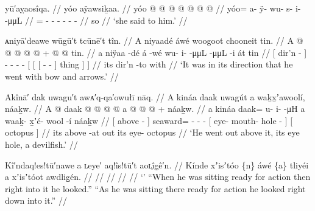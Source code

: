 
\ex\label{ex:91-203-she-said}%
%
\begingl
	\glpreamble	yū′aỵaosîqa. //
	\glpreamble	yóo aÿawsiḵaa. //
	\gla	yóo @  @ {} @ {} @ {} @ {} @ {} @ {} //
	\glb	yóo= a- ÿ- wu- s- i-  -μμL //
	\glc	{}= - - - - -
			 - //
	\gld	so  {} {} {} {} {} {} //
	\glft	‘she said to him.’
		//
\endgl
\xe


\ex\label{ex:91-204-direction-go-with-bownarrows}%
%
\begingl
	\glpreamble	ᴀniyā′deawe wūgū′t tcūnē′t tîn. //
	\glpreamble	A niyaadé áwé woogoot chooneit tin. //
	\gla	{} A  @ {} {}  @ {}
		 @ {} @ {} @ {} +
		{} {} {}  @ {} @ {} {} {} {} tin. {} //
	\glb	{} a niÿaa -dé {} á -wé
		wu- i-  -μμL
		{} {} {}  -μμL -i {} át {} tin {} //
	\glc	{}[  dir’n - {}]  -
		- -  -
		{}[ {}[ {}[  - - {}] thing {}]
			 {}] //
	\gld	{} its dir’n -to {}  {}
		 {} {} {}
		{} {} {}  {} {} {} {} {} with {} //
	\glft	‘It was in its direction that he went with bow and arrows.’
		//
\endgl
\xe

\ex\label{ex:91-205-out-above-it-eye-mouth-hole}%
%
\begingl
	\glpreamble	Akînā′ dak uwagu′t awᴀ′q-qa′owułī nāq. //
	\glpreamble	A kináa daak uwagút a waḵx̱ʼawoolí, náaḵw. //
	\gla	{} A  @ {} {}
		daak @  @ {} @ {} @ {}
		{} a  @ {} @ {} @ {} {} +
		{} náaḵw. {} //
	\glb	{} a kináa {} {}
		daak= u- i-  -μH
		{} a waaḵ- x̱ʼé- wool -í {}
		{} náaḵw {} //
	\glc	{}[  above - {}]
		seaward= - -  -
		{}[  eye- mouth- hole - {}]
		{}[ octopus {}] //
	\gld	{} its above -at {}
		out  {} {} {}
		{} its eye-  {} {} {}
		{} octopus {} //
	\glft	‘He went out above it, its eye hole, a devilfish.’
		//
\endgl
\xe

\ex\label{ex:91-206-}%
%
\begingl
	\glpreamble	Kî′ndaq!es!tū′nawe a ʟeye′ aq!îs!tū′t aoʟ̣îg̣ê′n. //
	\glpreamble	Kínde xʼisʼtóo \{n\} áwé \{a\} tliyéi a xʼisʼtóot awdlig̱én. //
	\gla	 //
	\glb	 //
	\glc	 //
	\gld	 //
	\glft	‘’\newline
		“When he was sitting ready for action then right into it he looked.”\newline
		“As he was sitting there ready for action he looked right down into it.”
		//
\endgl
\xe

